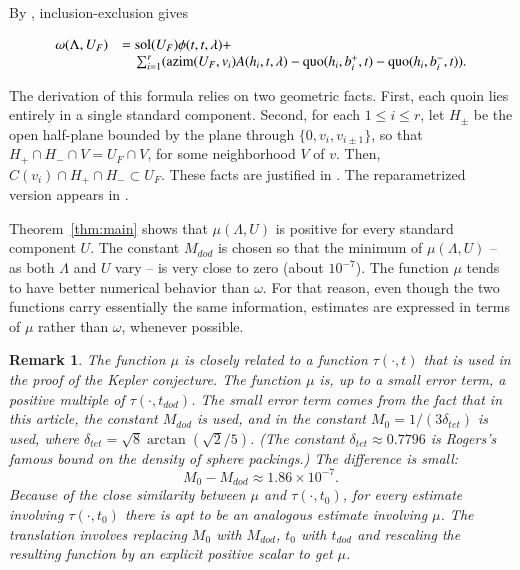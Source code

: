 \documentclass{article} %
\newtheorem{remark}[lemma]{Remark}
\begin{document}
By \cite[Eqn.~7.12]{Hales:2006:DCG}, inclusion-exclusion gives


\begin{equation}\label{eqn:in-ex-U}
  \begin{array}{lll}
    \omega(\Lambda,U_F) &= \operatorname{sol}(U_F) \phi(t,t,\lambda) + \\
    &\quad \sum_{i=1}^r ({\operatorname{azim}}(U_F,v_i) A(h_i,t,\lambda) - \operatorname{quo}(h_i,b_i^+,t) - 
    \operatorname{quo}(h_i,b_i^-,t)).
  \end{array}
\end{equation}

The derivation of this formula relies on two geometric facts. First,
each quoin lies entirely in a single standard component. Second, for
each $1\le i\le r$, let $H_{\pm}$ be the open half-plane bounded by
the plane through $\{0,v_i,v_{i\pm 1}\}$, so that $H_+\cap H_- \cap V
= U_F\cap V$, for some neighborhood $V$ of $v$. Then, $C(v_i)\cap
H_+\cap H_-\subset U_F$. These facts are justified in
\cite[Lemma~12.5]{Hales:2006:DCG}. The reparametrized version
appears in \cite{Hales:2002:Dodec}.

Theorem~\ref{thm:main} shows that $\mu(\Lambda,U)$ is positive
for every standard component $U$.  The constant
$M_{dod}$ is chosen so that the minimum of $\mu(\Lambda,U)$ -- as
both $\Lambda$ and $U$  vary -- is very close to zero (about $10^{-7}$).
The function $\mu$ tends to have better numerical behavior
than $\omega$.  For that reason, even though the two
functions carry essentially the same information,
estimates are expressed in terms
of $\mu$ rather than $\omega$, whenever possible.

\begin{remark}
  \label{rem:sq} 
  The function $\mu$ is closely related to a function $\tau(\cdot,t)$
  that is used in the proof of the Kepler conjecture. The function $\mu$
  is, up to a small error term, a positive multiple of
  $\tau(\cdot,t_{dod})$. The small error term comes from the fact that
  in this article, the constant $M_{dod}$ is used, and in
  \cite{Hales:2006:DCG} the constant $M_0=1/(3 \delta_{tet})$ is used,
  where $\delta_{tet} = \sqrt8 \arctan(\sqrt2/5)$. (The constant
  $\delta_{tet}\approx 0.7796$ is Rogers's famous bound on the density
  of sphere packings.) The difference is small:
  $$M_0 - M_{dod} \approx 1.86 \times 10^{-7}.$$
  Because of the close similarity between $\mu$ and $\tau(\cdot,t_0)$,
  for every estimate involving $\tau(\cdot,t_0)$ there is apt to be an
  analogous estimate involving $\mu$. The translation involves replacing
  $M_0$ with $M_{dod}$, $t_0$ with $t_{dod}$ and rescaling the resulting
  function by an explicit positive scalar to get $\mu$.
\end{remark}
\end{document}
